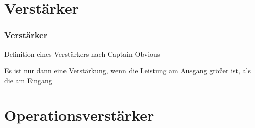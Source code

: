 \section{Verstärker}
\begin{frame}
\frametitle{Verstärker}
\begin{center}
\begin{block}{Definition eines Verstärkers nach Captain Obvious}
  \begin{Large}
    Es ist nur dann eine Verstärkung, wenn die Leistung am Ausgang größer ist, als die am Eingang
  \end{Large}
\end{block}
\end{center}
\end{frame}

\section*{Operationsverstärker}
